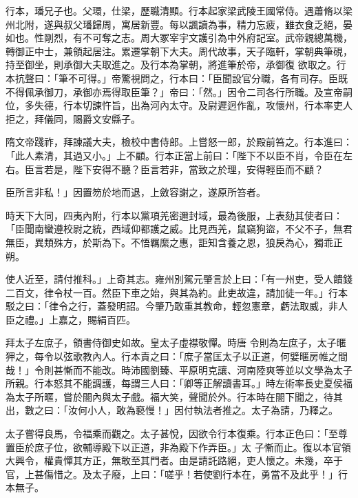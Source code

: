 \begin{pinyinscope}
 行本，璠兄子也。父環，仕梁，歷職清顯。行本起家梁武陵王國常侍。遇蕭脩以梁州北附，遂與叔父璠歸周，寓居新豐。每以諷讀為事，精力忘疲，雖衣食乏絕，晏如也。性剛烈，有不可奪之志。周大冢宰宇文護引為中外府記室。武帝親總萬機，轉御正中士，兼領起居注。累遷掌朝下大夫。周代故事，天子臨軒，掌朝典筆硯，持至御坐，則承御大夫取進之。及行本為掌朝，將進筆於帝，承御復
 欲取之。行本抗聲曰：「筆不可得。」帝驚視問之，行本曰：「臣聞設官分職，各有司存。臣既不得佩承御刀，承御亦焉得取臣筆？」帝曰：「然。」因令二司各行所職。及宣帝嗣位，多失德，行本切諫忤旨，出為河內太守。及尉遲迥作亂，攻懷州，行本率吏人拒之，拜儀同，賜爵文安縣子。



 隋文帝踐祚，拜諫議大夫，檢校中書侍郎。上嘗怒一郎，於殿前笞之。行本進曰：「此人素清，其過又小。」上不顧。行本正當上前曰：「陛下不以臣不肖，令臣在左右。臣言若是，陛下安得不聽？臣言若非，當致之於理，安得輕臣而不顧？



 臣所言非私！」因置笏於地而退，上斂容謝之，遂原所笞者。



 時天下大同，四夷內附，行本以黨項羌密邇封域，最為後服，上表劾其使者曰：「臣聞南蠻遵校尉之統，西域仰都護之威。比見西羌，鼠竊狗盜，不父不子，無君無臣，異類殊方，於斯為下。不悟羈縻之惠，詎知含養之恩，狼戾為心，獨乖正朔。



 使人近至，請付推科。」上奇其志。雍州別駕元肇言於上曰：「有一州吏，受人饋錢二百文，律令杖一百。然臣下車之始，與其為約。此吏故違，請加徒一年。」行本駁之曰：「律令之行，蓋發明詔。今肇乃敢重其教命，輕忽憲章，虧法取威，非人臣之禮。」上嘉之，賜絹百匹。



 拜太子左庶子，領書侍御史如故。皇太子虛襟敬憚。時唐
 令則為左庶子，太子暱狎之，每令以弦歌教內人。行本責之曰：「庶子當匡太子以正道，何嬖暱房帷之間哉！」令則甚慚而不能改。時沛國劉臻、平原明克讓、河南陸爽等並以文學為太子所親。行本怒其不能調護，每謂三人曰：「卿等正解讀書耳。」時左術率長史夏侯福為太子所暱，嘗於閤內與太子戲。福大笑，聲聞於外。行本時在閤下聞之，待其出，數之曰：「汝何小人，敢為褻慢！」因付執法者推之。太子為請，乃釋之。



 太子嘗得良馬，令福乘而觀之。太子甚悅，因欲令行本復乘。行本正色曰：「至尊置臣於庶子位，欲輔導殿下以正道，非為殿下作弄臣。」太
 子慚而止。復以本官領大興令，權貴憚其方正，無敢至其門者。由是請託路絕，吏人懷之。未幾，卒于官，上甚傷惜之。及太子廢，上曰：「嗟乎！若使劉行本在，勇當不及此乎！」行本無子。




\end{pinyinscope}
